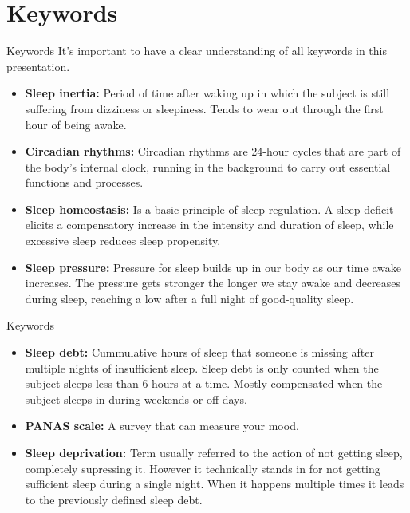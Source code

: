 \documentclass{beamer}
\begin{document}
\section{Keywords}

\begin{frame}{Keywords}
    It's important to have a clear understanding of all keywords in this presentation.

\begin{itemize}
    \item \textbf{Sleep inertia:} Period of time after waking up in which the subject is still suffering from dizziness or sleepiness. Tends to wear out through the first hour of being awake.
    \item \textbf{Circadian rhythms:} Circadian rhythms are 24-hour cycles that are part of the body’s internal clock, running in the background to carry out essential functions and processes.  
    \item \textbf{Sleep homeostasis:} Is a basic principle of sleep regulation. A sleep deficit elicits a compensatory increase in the intensity and duration of sleep, while excessive sleep reduces sleep propensity.
    \item \textbf{Sleep pressure:} Pressure for sleep builds up in our body as our time awake increases. The pressure gets stronger the longer we stay awake and decreases during sleep, reaching a low after a full night of good-quality sleep.
\end{itemize}
\end{frame}

\begin{frame}{Keywords}
\begin{itemize}
     \item \textbf{Sleep debt:} Cummulative hours of sleep that someone is missing after multiple nights of insufficient sleep. Sleep debt is only counted when the subject sleeps less than 6 hours at a time. Mostly compensated when the subject sleeps-in during weekends or off-days. 
    \item \textbf{PANAS scale:}  A survey that can measure your mood.
    \item \textbf{Sleep deprivation:} Term usually referred to the action of not getting sleep, completely supressing it. However it technically stands in for not getting sufficient sleep during a single night. When it happens multiple times it leads to the previously defined sleep debt.
\end{itemize}
\end{frame}
\end{document}
